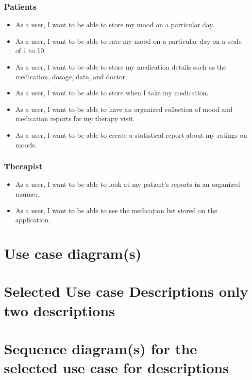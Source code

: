 \documentclass[11pt]{article}
\begin{document}
\subsection{Patients}
\begin{itemize}
\item As a user, I want to be able to store my mood on a particular day.
\item As a user, I want to be able to rate my mood on a particular day on a scale of 1 to 10.
\item As a user, I want to be able to store my medication details such as the medication, dosage, date, and doctor.
\item As a user, I want to be able to store when I take my medication. 
\item As a user, I want to be able to have an organized collection of mood and medication reports for my therapy visit. 
\item As a user, I want to be able to create a statistical report about my ratings on moods. 

\end{itemize}

\subsection{Therapist}
\begin{itemize}
\item As a user, I want to be able to look at my patient's reports in an organized manner.
\item As a user, I want to be able to see the medication list stored on the application. 

\end{itemize}

    \chapter{Use case diagram(s)}


    \chapter{Selected Use case Descriptions {only two descriptions}}


    \chapter{Sequence diagram(s) {for the selected use case for descriptions}}
\end{document}
